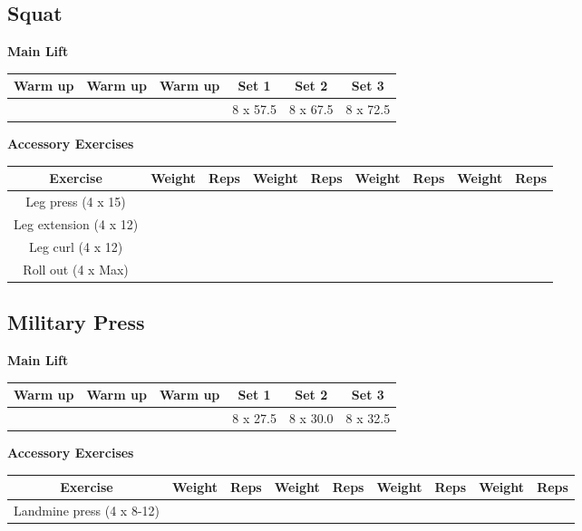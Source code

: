 \documentclass{article}%
\begin{document}
\subsection*{Squat}%
\vspace*{20pt}%
\linebreak%
\begin{minipage}{0.5\textwidth}%
\textbf{Main Lift\newline%
\newline%
}%
\begin{tabular}{|c|c|c|c|c|c|}%
\hline%
Warm up&Warm up&Warm up&Set 1&Set 2&Set 3\\%
\hline%
&&&8 x 57.5&8 x 67.5&8 x 72.5\\%
\hline%
\end{tabular}%
\vspace*{20pt}%
\linebreak%
\textbf{Accessory Exercises\newline%
\newline%
}%
\begin{tabular}{|c|c|c|c|c|c|c|c|c|}%
\hline%
Exercise&Weight&Reps&Weight&Reps&Weight&Reps&Weight&Reps\\%
\hline%
Leg press (4 x 15)&&&&&&&&\\%
\hline%
Leg extension (4 x 12)&&&&&&&&\\%
\hline%
Leg curl (4 x 12)&&&&&&&&\\%
\hline%
Roll out (4 x Max)&&&&&&&&\\%
\hline%
\end{tabular}%
\end{minipage}%
\vspace*{20pt}%
\linebreak

%
\subsection*{Military Press}%
\vspace*{20pt}%
\linebreak%
\begin{minipage}{0.5\textwidth}%
\textbf{Main Lift\newline%
\newline%
}%
\begin{tabular}{|c|c|c|c|c|c|}%
\hline%
Warm up&Warm up&Warm up&Set 1&Set 2&Set 3\\%
\hline%
&&&8 x 27.5&8 x 30.0&8 x 32.5\\%
\hline%
\end{tabular}%
\vspace*{20pt}%
\linebreak%
\textbf{Accessory Exercises\newline%
\newline%
}%
\begin{tabular}{|c|c|c|c|c|c|c|c|c|}%
\hline%
Exercise&Weight&Reps&Weight&Reps&Weight&Reps&Weight&Reps\\%
\hline%
Landmine press (4 x 8{-}12)&&&&&&&&\\%
\hline%
\end{tabular}%
\end{minipage}%
\vspace*{20pt}%
\linebreak
\end{document}
